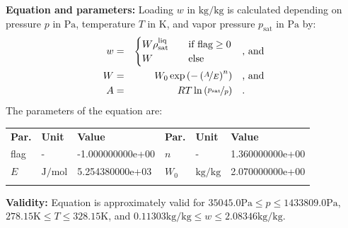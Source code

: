\textbf{Equation and parameters:}
\newline
%
Loading $w$ in $\si{\kilogram\per\kilogram}$ is calculated depending on pressure $p$ in $\si{\pascal}$, temperature $T$ in $\si{\kelvin}$, and vapor pressure $p_\mathrm{sat}$ in $\si{\pascal}$ by:
%
\begin{equation*}
\begin{split}
w &=& \begin{cases} W \rho_\mathrm{sat}^{\mathrm{liq}} & \quad \text{if flag} \geq 0 \\ W & \quad \text{else} \end{cases} & \quad\text{, and} \\
W &=& W_0 \exp \left( - \left( \nicefrac{A}{E} \right) ^{n} \right) & \quad\text{, and} \\
A &=& R T \ln \left( \nicefrac{p_\mathrm{sat}}{p} \right) & \quad\text{.} \\
\end{split}
\end{equation*}
%
The parameters of the equation are:
%
\begin{longtable}[l]{lll|lll}
\toprule
\addlinespace
\textbf{Par.} & \textbf{Unit} & \textbf{Value} &	\textbf{Par.} & \textbf{Unit} & \textbf{Value} \\
\addlinespace
\midrule
\endhead

\bottomrule
\endfoot
\bottomrule
\endlastfoot
\addlinespace

flag & - & -1.000000000e+00 & $n$ & - & 1.360000000e+00 \\
$E$ & $\si{\joule\per\mole}$ & 5.254380000e+03 & $W_0$ & $\si{\kilogram\per\kilogram}$ & 2.070000000e+00 \\

\addlinespace\end{longtable}

\textbf{Validity:}
\newline
Equation is approximately valid for $35045.0 \si{\pascal} \leq p \leq 1433809.0 \si{\pascal}$,  $278.15 \si{\kelvin} \leq T \leq 328.15 \si{\kelvin}$, and $0.11303 \si{\kilogram\per\kilogram} \leq w \leq 2.08346 \si{\kilogram\per\kilogram}$.
\newline

